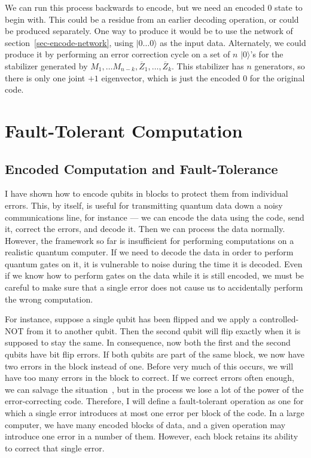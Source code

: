 \documentclass{report}
\newcommand{\ket}[1]{|{#1}\rangle}
\newcommand{\Zbar}{\overline{Z}}
\begin{document}
We can run this process backwards to encode, but we need an encoded $0$ 
state to begin with.  This could be a residue from an earlier decoding 
operation, or could be produced separately.  One way to produce it would 
be to use the network of section~\ref{sec-encode-network}, using 
$\ket{0\ldots 0}$ as the input data.  Alternately, we could produce it by 
performing an error correction cycle on a set of $n$ $\ket{0}$'s for the 
stabilizer generated by $M_1, \ldots M_{n-k}, \Zbar_1, \ldots, \Zbar_k$.  
This stabilizer has $n$ generators, so there is only one joint $+1$ 
eigenvector, which is just the encoded $0$ for the original code.

\chapter{Fault-Tolerant Computation}
\label{chap-fault-tolerant}

\section{Encoded Computation and Fault-Tolerance}

I have shown how to encode qubits in blocks to protect them from 
individual errors.  This, by itself, is useful for transmitting quantum data 
down a noisy communications line, for instance --- we can encode the data 
using the code, send it, correct the errors, and decode it.  Then we can 
process the data normally.  However, the framework so far is insufficient 
for performing computations on a realistic quantum computer.  If we need 
to decode the data in order to perform quantum gates on it, it is vulnerable 
to noise during the time it is decoded.  Even if we know how to perform 
gates on the data while it is still encoded, we must be careful to make sure 
that a single error does not cause us to accidentally perform the wrong 
computation.

For instance, suppose a single qubit has been flipped and we apply a 
con\-trolled-NOT from it to another qubit.  Then the second qubit will flip 
exactly when it is supposed to stay the same.  In consequence, now both 
the first and the second qubits have bit flip errors.  If both qubits are part 
of the same block, we now have two errors in the block instead of one.  
Before very much of this occurs, we will have too many errors in the block 
to correct.  If we correct errors often enough, we can salvage the 
situation~\cite{aharonov}, but in the process we lose a lot of the power of 
the error-correcting code.  Therefore, I will define a fault-tolerant 
operation as one for which a single error introduces at most one error per 
block of the code.  In a large computer, we have many encoded blocks of 
data, and a given operation may introduce one error in a number of them.  
However, each block retains its ability to correct that single error.
\end{document}
